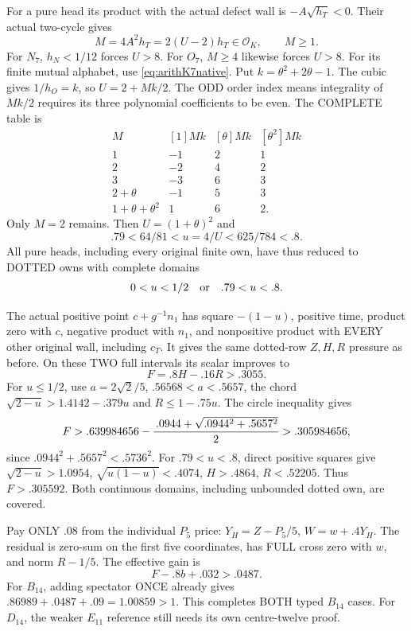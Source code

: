 \documentclass[11pt]{article}
\begin{document}
For a pure head its product with the actual defect
wall is \(-A\sqrt{h_T}<0\).
Their actual two-cycle gives
\[
              M=4A^2h_T=2(U-2)h_T\in\mathcal O_K,\qquad M\ge1 .
\]
For \(N_7\), \(h_N<1/12\) forces \(U>8\).
For \(O_7\), \(M\ge4\) likewise forces \(U>8\).
For its finite mutual alphabet, use
\eqref{eq:arithK7native}.
Put \(k=\theta^2+2\theta-1\).
The cubic gives \(1/h_O=k\), so \(U=2+Mk/2\).
The ODD order index means integrality of \(Mk/2\)
requires its three polynomial coefficients to be even.
The COMPLETE table is
\[
\begin{array}{c|rrr}
 M&[1]Mk&[\theta]Mk&[\theta^2]Mk\\ \hline
 1&-1&2&1\\
 2&-2&4&2\\
 3&-3&6&3\\
 2+\theta&-1&5&3\\
 1+\theta+\theta^2&1&6&2 .
\end{array}
\]
Only \(M=2\) remains.
Then \(U=(1+\theta)^2\) and
\[
             .79<64/81<u=4/U<625/784<.8 .
\]
All pure heads, including every original finite own,
have thus reduced to DOTTED owns with complete domains
\[
                            0<u<1/2
                   \quad\hbox{or}\quad .79<u<.8 .
\]

The actual positive point \(c+g^{-1}n_1\) has square
\(-(1-u)\), positive time, product zero with \(c\),
negative product with \(n_1\), and nonpositive product
with EVERY other original wall, including \(c_T\).
It gives the same dotted-row \(Z,H,R\) pressure as before.
On these TWO full intervals its scalar improves to
\[
                             F=.8H-.16R>.3055 .
\]
For \(u\le1/2\), use \(a=2\sqrt2/5\),
\(.56568<a<.5657\), the chord
\(\sqrt{2-u}>1.4142-.379u\) and \(R\le1-.75u\).
The circle inequality gives
\[
 F>.639984656-
       {\, .0944+\sqrt{.0944^2+.5657^2}\over2}
       >.305984656,
\]
since \(.0944^2+.5657^2<.5736^2\).
For \(.79<u<.8\), direct positive squares give
\(\sqrt{2-u}>1.0954\),
\(\sqrt{u(1-u)}<.4074\),
\(H>.4864\), \(R<.52205\).
Thus \(F>.305592\).
Both continuous domains, including unbounded dotted
own, are covered.

Pay ONLY \(.08\) from the individual \(P_5\) price:
\(Y_H=Z-P_5/5\), \(W=w+.4Y_H\).
The residual is zero-sum on the first five coordinates,
has FULL cross zero with \(w\), and norm \(R-1/5\).
The effective gain is
\[
                        F-.8b+.032>.0487 .
\tag{TG}\label{eq:arithBD14typedgain}
\]
For \(B_{14}\), adding spectator ONCE already gives
\(.86989+.0487+.09=1.00859>1\).
This completes BOTH typed \(B_{14}\) cases.
For \(D_{14}\), the weaker \(E_{11}\) reference
still needs its own centre-twelve proof.
\end{document}

